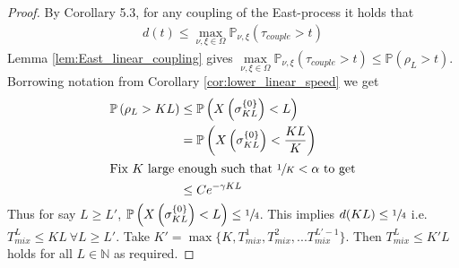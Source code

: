 \documentclass{article}
\theoremstyle{slimTheoremStyle} %
\theoremstyle{slimDefinitionStyle}
\theoremstyle{remark}
\newcommand{\N}{\mathbb{N}}
\renewcommand{\P}{\mathbb{P}}
\renewcommand{\Pr}[1]{\mathbb{P} \left( #1 \right)}
\begin{document}
\begin{proof}
By \cite{levin2017markov} Corollary 5.3, for any coupling of the East-process it holds that 
\begin{align}
d(t) \leq \max\limits_{\nu, \xi \in \Omega} \P_{\nu, \xi} ( \tau_{couple} > t )
\end{align}
Lemma \ref{lem:East_linear_coupling} gives $\max\limits_{\nu, \xi \in \Omega} \P_{\nu, \xi} ( \tau_{couple} > t ) \leq \Pr{\rho_L > t}$. Borrowing notation from Corollary \ref{cor:lower_linear_speed} we get 
\begin{align*}
\Pr{\rho_L > KL} &\leq \Pr{X\left(\sigma^{\{0\}}_{KL}\right) < L} \\
                 &= \Pr{X\left(\sigma^{\{0\}}_{KL}\right) < \frac{KL}{K}} \\
  \intertext{Fix $K$ large enough such that $\sfrac{1}{K} < \alpha$ to get}
                 &\leq C e^{-\gamma K L}
\end{align*}
Thus for say $L \geq L'$, $\Pr{X\left(\sigma^{\{0\}}_{KL} \right) < L} \leq \sfrac{1}{4}$. This implies $d(KL) \leq \sfrac{1}{4}$ i.e. $T^L_{mix} \leq KL\ \forall L \geq L'$. Take $K' = \max\lbrace K, T^1_{mix}, T^2_{mix},... T^{L' - 1}_{mix} \rbrace$. Then $T^L_{mix} \leq K'L$ holds for all $L \in \N$ as required. 
\end{proof}




\end{document}
